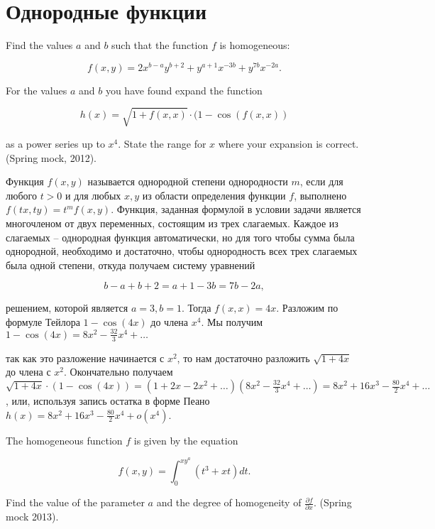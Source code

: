 

\section{Однородные функции}

\begin{problem}
Find the values $a$ and $b$ such that the function $f$ is homogeneous:

\[f(x,y)=2x^{b-a} y^{b+2} +y^{a+1} x^{-3b} +y^{7b} x^{-2a} .\] 

For the values $a$ and $b$ you have found expand the function

\[h(x)=\sqrt{1+f(x,x)} \cdot (1-\cos (f(x,x))\] 

as a power series up to $x^{4} $. State the range for $x$ where your expansion is correct. (Spring mock, 2012).
\end{problem}


\begin{solution}
Функция $f(x,y)$ называется однородной степени однородности $m$, если для любого $t>0$ и для любых $x,y$ из области определения функции $f$, выполнено $f(tx,ty)=t^{m} f(x,y)$. Функция, заданная формулой в условии задачи является многочленом от двух переменных, состоящим из трех слагаемых. Каждое из слагаемых -- однородная функция автоматически, но для того чтобы сумма была однородной, необходимо и достаточно, чтобы однородность всех трех слагаемых была одной степени, откуда получаем систему уравнений 

\[b-a+b+2=a+1-3b=7b-2a,\] 

решением, которой является $a=3,  b=1$. Тогда $f(x,x)=4x$. Разложим по формуле Тейлора $1-\cos (4x)$ до члена $x^{4} $. Мы получим $1-\cos (4x)=8x^{2} -\frac{32}{3} x^{4} +\ldots $

так как это разложение начинается с $x^{2} $, то нам достаточно разложить $\sqrt{1+4x} $ до члена с $x^{2} $. Окончательно получаем $\sqrt{1+4x} \cdot (1-\cos (4x))=(1+2x-2x^{2} +\ldots )(8x^{2} -\frac{32}{3} x^{4} + \ldots )=8x^{2} +16x^{3} -\frac{80}{2} x^{4} +\ldots $, или, используя запись остатка в форме Пеано $h(x)=8x^{2} +16x^{3} -\frac{80}{2} x^{4} +o(x^{4} )$.
\end{solution}


\begin{problem}
The homogeneous function $f$ is given by the equation

\[f(x,y)=\int _{0}^{xy^{a} }(t^{3} +xt)dt .\] 


Find the value of the parameter $a$ and the degree of homogeneity of $\frac{\partial f}{\partial x} $. (Spring mock 2013).
\end{problem}


